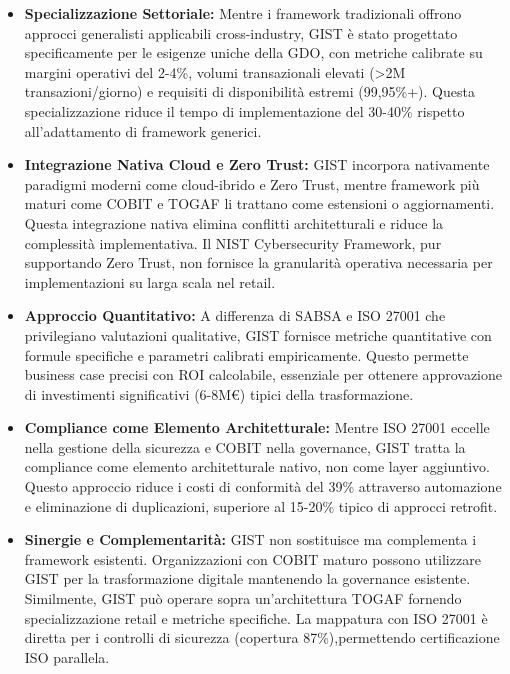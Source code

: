 \begin{itemize}
    \item \textbf{Specializzazione Settoriale:} Mentre i framework tradizionali offrono approcci generalisti applicabili cross-industry, GIST è stato progettato specificamente per le esigenze uniche della GDO, con metriche calibrate su margini operativi del 2-4\%, volumi transazionali elevati (>2M
    transazioni/giorno) e requisiti di disponibilità estremi (99,95\%+). Questa specializzazione riduce il tempo di implementazione del 30-40\% rispetto all’adattamento di framework generici.
    \item \textbf{Integrazione Nativa Cloud e Zero Trust:} GIST incorpora nativamente paradigmi moderni come cloud-ibrido e Zero Trust, mentre framework più maturi come COBIT e TOGAF li trattano come estensioni
    o aggiornamenti. Questa integrazione nativa elimina conflitti architetturali e riduce la complessità implementativa. Il NIST Cybersecurity Framework, pur supportando Zero Trust, non fornisce la granularità operativa
    necessaria per implementazioni su larga scala nel retail.
    \item \textbf{Approccio Quantitativo:} A differenza di SABSA e ISO 27001 che privilegiano valutazioni qualitative, GIST fornisce metriche quantitative
    con formule specifiche e parametri calibrati empiricamente. Questo permette business case precisi con ROI calcolabile, essenziale per ottenere
    approvazione di investimenti significativi (6-8M€) tipici della trasformazione.
    \item \textbf{Compliance come Elemento Architetturale:} Mentre ISO 27001
    eccelle nella gestione della sicurezza e COBIT nella governance, GIST
    tratta la compliance come elemento architetturale nativo, non come layer
    aggiuntivo. Questo approccio riduce i costi di conformità del 39\% attraverso automazione e eliminazione di duplicazioni, superiore al 15-20\% tipico di approcci retrofit.
    \item \textbf{Sinergie e Complementarità:} GIST non sostituisce ma complementa i framework esistenti. Organizzazioni con COBIT maturo possono
    utilizzare GIST per la trasformazione digitale mantenendo la governance esistente. Similmente, GIST può operare sopra un’architettura TOGAF fornendo specializzazione retail e metriche specifiche. La mappatura con ISO 27001 è diretta per i controlli di sicurezza (copertura 87\%),permettendo certificazione ISO parallela.
\end{itemize}
